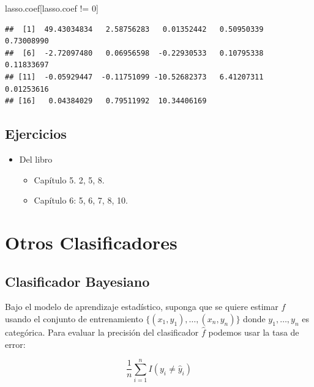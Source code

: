 \documentclass[
  12pt,
]{book}
\newenvironment{Shaded}{\begin{snugshade}}{\end{snugshade}}
\newcommand{\DecValTok}[1]{\textcolor[rgb]{0.00,0.00,0.81}{#1}}
\newcommand{\NormalTok}[1]{#1}
\newcommand{\SpecialCharTok}[1]{\textcolor[rgb]{0.00,0.00,0.00}{#1}}
\providecommand{\tightlist}{%
  \setlength{\itemsep}{0pt}\setlength{\parskip}{0pt}}
\theoremstyle{definition}
\theoremstyle{definition}
\theoremstyle{definition}
\theoremstyle{definition}
\theoremstyle{remark}
\begin{document}
\begin{Shaded}
\begin{Highlighting}[]
\NormalTok{lasso.coef[lasso.coef }\SpecialCharTok{!=} \DecValTok{0}\NormalTok{]}
\end{Highlighting}
\end{Shaded}

\begin{verbatim}
##  [1]  49.43034834   2.58756283   0.01352442   0.50950339   0.73008990
##  [6]  -2.72097480   0.06956598  -0.22930533   0.10795338   0.11833697
## [11]  -0.05929447  -0.11751099 -10.52682373   6.41207311   0.01253616
## [16]   0.04384029   0.79511992  10.34406169
\end{verbatim}

\hypertarget{ejercicios-4}{%
\section{Ejercicios}\label{ejercicios-4}}

\begin{itemize}
\tightlist
\item
  Del libro \autocite{James2013b}

  \begin{itemize}
  \tightlist
  \item
    Capítulo 5. 2, 5, 8.
  \item
    Capítulo 6: 5, 6, 7, 8, 10.
  \end{itemize}
\end{itemize}

\hypertarget{otros-clasificadores}{%
\chapter{Otros Clasificadores}\label{otros-clasificadores}}

\hypertarget{clasificador-bayesiano}{%
\section{Clasificador Bayesiano}\label{clasificador-bayesiano}}

Bajo el modelo de aprendizaje estadístico, suponga que se quiere estimar \(f\) usando el conjunto de entrenamiento \(\{(x_1,y_1),\ldots,(x_n,y_n)\}\) donde \(y_1,\ldots,y_n\) es categórica. Para evaluar la precisión del clasificador \(\hat f\) podemos usar la tasa de error:

\[\frac 1 n \sum_{i=1}^nI(y_i\neq \hat y_i)\]
\end{document}
